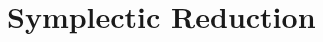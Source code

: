 \documentclass[10pt]{beamer}
\begin{document}
    
      \section{Symplectic Reduction}
      \checkpoint
    
\end{document}
